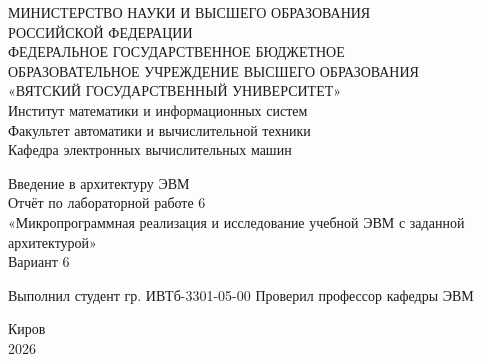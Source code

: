 \documentclass[oneside,a4paper,14pt]{extarticle}
\begin{document}
\newpage\thispagestyle{empty}
\begin{center}
	МИНИСТЕРСТВО НАУКИ И ВЫСШЕГО ОБРАЗОВАНИЯ\\
	РОССИЙСКОЙ ФЕДЕРАЦИИ\\
	ФЕДЕРАЛЬНОЕ ГОСУДАРСТВЕННОЕ БЮДЖЕТНОЕ\\
	ОБРАЗОВАТЕЛЬНОЕ УЧРЕЖДЕНИЕ ВЫСШЕГО ОБРАЗОВАНИЯ\\
	«ВЯТСКИЙ ГОСУДАРСТВЕННЫЙ УНИВЕРСИТЕТ»\\
	Институт математики и информационных систем\\
	Факультет автоматики и вычислительной техники\\
	Кафедра электронных вычислительных машин
\end{center}
\vspace{20mm}
\begin{center}
	Введение в архитектуру ЭВМ\\
	Отчёт по лабораторной работе 6\\
	«Микропрограммная реализация и исследование учебной ЭВМ с заданной архитектурой»\\
	Вариант 6
\end{center}
\vfill
Выполнил студент гр. ИВТб-3301-05-00 \hfill
{}
Проверил профессор кафедры ЭВМ\hfill
{}
\vfill
\begin{center}
	Киров\\
	2026
\end{center}
\end{document}
